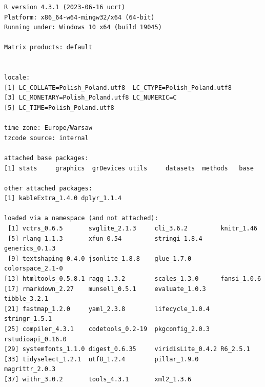 \documentclass[
]{article}
\begin{document}
\begin{verbatim}
R version 4.3.1 (2023-06-16 ucrt)
Platform: x86_64-w64-mingw32/x64 (64-bit)
Running under: Windows 10 x64 (build 19045)

Matrix products: default


locale:
[1] LC_COLLATE=Polish_Poland.utf8  LC_CTYPE=Polish_Poland.utf8   
[3] LC_MONETARY=Polish_Poland.utf8 LC_NUMERIC=C                  
[5] LC_TIME=Polish_Poland.utf8    

time zone: Europe/Warsaw
tzcode source: internal

attached base packages:
[1] stats     graphics  grDevices utils     datasets  methods   base     

other attached packages:
[1] kableExtra_1.4.0 dplyr_1.1.4     

loaded via a namespace (and not attached):
 [1] vctrs_0.6.5       svglite_2.1.3     cli_3.6.2         knitr_1.46       
 [5] rlang_1.1.3       xfun_0.54         stringi_1.8.4     generics_0.1.3   
 [9] textshaping_0.4.0 jsonlite_1.8.8    glue_1.7.0        colorspace_2.1-0 
[13] htmltools_0.5.8.1 ragg_1.3.2        scales_1.3.0      fansi_1.0.6      
[17] rmarkdown_2.27    munsell_0.5.1     evaluate_1.0.3    tibble_3.2.1     
[21] fastmap_1.2.0     yaml_2.3.8        lifecycle_1.0.4   stringr_1.5.1    
[25] compiler_4.3.1    codetools_0.2-19  pkgconfig_2.0.3   rstudioapi_0.16.0
[29] systemfonts_1.1.0 digest_0.6.35     viridisLite_0.4.2 R6_2.5.1         
[33] tidyselect_1.2.1  utf8_1.2.4        pillar_1.9.0      magrittr_2.0.3   
[37] withr_3.0.2       tools_4.3.1       xml2_1.3.6       
\end{verbatim}
\end{document}

